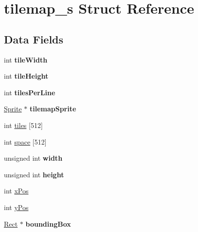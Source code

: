 \hypertarget{structtilemap__s}{}\section{tilemap\+\_\+s Struct Reference}
\label{structtilemap__s}
\subsection*{Data Fields}
\begin{DoxyCompactItemize}
\item 
\mbox{\label{structtilemap__s_a0d7dc92d8c4e78c59e24c48955ebb865}} 
int {\bfseries tile\+Width}
\item 
\mbox{\label{structtilemap__s_ad05ab353f9f72c1ae3e30cf7f962c6ef}} 
int {\bfseries tile\+Height}
\item 
\mbox{\label{structtilemap__s_a718cfcaa17c0fe278febb382e9e5469c}} 
int {\bfseries tiles\+Per\+Line}
\item 
\mbox{\label{structtilemap__s_a98ed29ccb33f20a9d2784d8e18e9944c}} 
\hyperlink{struct_sprite___s}{Sprite} $\ast$ {\bfseries tilemap\+Sprite}
\item 
int \hyperlink{structtilemap__s_a0d1eb4f410c73be99ca705d6c88032bb}{tiles} \mbox{[}512\mbox{]}
\item 
int \hyperlink{structtilemap__s_a1bd608d2e076f47094fd2544223e7ddd}{space} \mbox{[}512\mbox{]}
\item 
\mbox{\label{structtilemap__s_aca34d28e3d8bcbcadb8edb4e3af24f8c}} 
unsigned int {\bfseries width}
\item 
\mbox{\label{structtilemap__s_ab2e78c61905b4419fcc7b4cfc500fe85}} 
unsigned int {\bfseries height}
\item 
int \hyperlink{structtilemap__s_a6806e78862b165988ca9b855e230084e}{x\+Pos}
\item 
int \hyperlink{structtilemap__s_adbae1d6f68d046bbecaa7230baf64762}{y\+Pos}
\item 
\mbox{\label{structtilemap__s_a3d49780e142d5f067cdd71be48ad284d}} 
\hyperlink{structrect__s}{Rect} $\ast$ {\bfseries bounding\+Box}
\end{DoxyCompactItemize}


